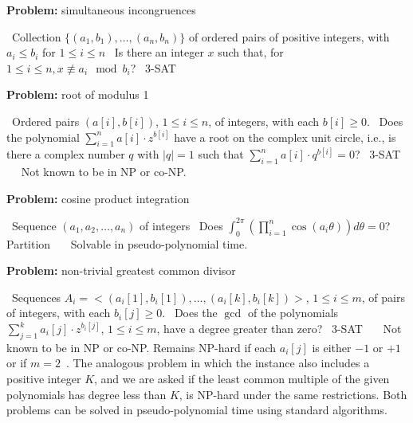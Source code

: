 \documentclass{amsart}
\theoremstyle{plain}
\begin{document}
\begin{algorithm}[h]
  \caption*{\textbf{Problem:} simultaneous incongruences}
  \begin{algorithmic}[1]
    \Require\, Collection $\{(a_1,b_1),\ldots,(a_n,b_n)\}$ of ordered pairs of positive integers,
    with $a_i\leq b_i$ for $1\leq i\leq n$
    \Description\, Is there an integer $x$ such that, for $1\leq i\leq n, x\not\equiv a_i\mod b_i$?
    \Reduction\, 3-SAT
    \Reference\,~\cite{stockmeyer-meyer}
  \end{algorithmic}
\end{algorithm}

\begin{algorithm}[h]
  \caption*{\textbf{Problem:} root of modulus 1}
  \begin{algorithmic}[1]
    \Require\, Ordered pairs $(a[i],b[i])$, $1\leq i\leq n$, of integers, with each $b[i]\geq 0$.
    \Description\, Does the polynomial $\sum_{i=1}^n a[i]\cdot z^{b[i]}$ have a root on the complex
    unit circle, i.e., is there a complex number $q$ with $|q|=1$ such that $\sum_{i=1}^n a[i]\cdot
    q^{b[i]}=0$?
    \Reduction\, 3-SAT
    \Reference\,~\cite{plaisted-77b}
    \Commentx\, Not known to be in NP or co-NP\@.
  \end{algorithmic}
\end{algorithm}

\begin{algorithm}[h]
  \caption*{\textbf{Problem:} cosine product integration}
  \begin{algorithmic}[1]
    \Require\, Sequence $(a_1,a_2,\ldots,a_n)$ of integers
    \Description\, Does $\int_0^{2\pi}(\prod_{i=1}^n \cos(a_i\theta))d\theta=0$?
    \Reduction\, Partition
    \Reference\,~\cite{plaisted-76}
    \Commentx\, Solvable in pseudo-polynomial time.
  \end{algorithmic}
\end{algorithm}

\begin{algorithm}[h]
  \caption*{\textbf{Problem:} non-trivial greatest common divisor}
  \begin{algorithmic}[1]
    \Require\, Sequences $A_i=<(a_i[1],b_i[1]),\ldots,(a_i[k],b_i[k])>$, $1\leq i\leq m$, of pairs
    of integers, with each $b_i[j]\geq 0$.
    \Description\, Does the $\gcd$ of the polynomials $\sum_{j=1}^k a_i[j]\cdot z^{b_i[j]}$, $1\leq
    i\leq m$, have a degree greater than zero?
    \Reduction\, 3-SAT
    \Reference\,~\cite{plaisted-77a}
    \Commentx\, Not known to be in NP or co-NP\@. Remains NP-hard if each $a_i[j]$ is either $-1$
    or $+1$~\cite{plaisted-76} or if $m=2$~\cite{plaisted-77b}. The analogous problem in which the
    instance also includes a positive integer $K$, and we are asked if the least common multiple of
    the given polynomials has degree less than $K$, is NP-hard under the same restrictions. Both
    problems can be solved in pseudo-polynomial time using standard algorithms.
  \end{algorithmic}
\end{algorithm}
\newpage
\end{document}
